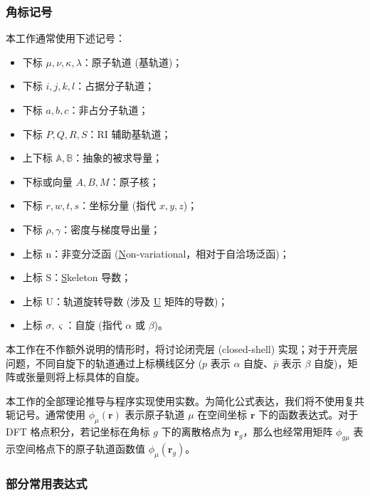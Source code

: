 \subsubsection{角标记号}

本工作通常使用下述记号：
\begin{itemize}[nosep]
  \item 下标 $\mu, \nu, \kappa, \lambda$：原子轨道 (基轨道)；
  \item 下标 $i, j, k, l$：占据分子轨道；
  \item 下标 $a, b, c$：非占分子轨道；
  \item 下标 $P, Q, R, S$：RI 辅助基轨道；
  \item 上下标 $\mathbb{A}, \mathbb{B}$：抽象的被求导量；
  \item 下标或向量 $A, B, M$：原子核；
  \item 下标 $r, w, t, s$：坐标分量 (指代 $x, y, z$)；
  \item 下标 $\rho, \gamma$：密度与梯度导出量；
  \item 上标 $\mathrm{n}$：非变分泛函 (\underline{N}on-variational，相对于自洽场泛函)；
  \item 上标 $\mathrm{S}$：\underline{S}keleton 导数；
  \item 上标 $\mathrm{U}$：轨道旋转导数 (涉及 \underline{U} 矩阵的导数)；
  \item 上标 $\sigma, \varsigma$：自旋 (指代 $\alpha$ 或 $\beta$)。
\end{itemize}

本工作在不作额外说明的情形时，将讨论闭壳层 (closed-shell) 实现；对于开壳层问题，不同自旋下的轨道通过上标横线区分 ($p$ 表示 $\alpha$ 自旋、$\bar p$ 表示 $\beta$ 自旋)，矩阵或张量则将上标具体的自旋。

本工作的全部理论推导与程序实现使用实数。为简化公式表达，我们将不使用复共轭记号。通常使用 $\phi_\mu (\bm{r})$ 表示原子轨道 $\mu$ 在空间坐标 $\bm{r}$ 下的函数表达式。对于 DFT 格点积分，若记坐标在角标 $g$ 下的离散格点为 $\bm{r}_g$，那么也经常用矩阵 $\phi_{g \mu}$ 表示空间格点下的原子轨道函数值 $\phi_\mu (\bm{r}_g)$。

\subsubsection{部分常用表达式}


